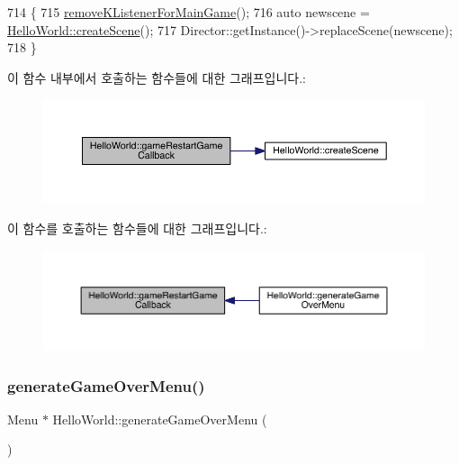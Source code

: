 \begin{DoxyCode}
714                                                     \{
715     \hyperlink{class_hello_world_aa4aaf4a6d2ae2e0cb07273d0ee004861}{removeKListenerForMainGame}();
716     \textcolor{keyword}{auto} newscene =  \hyperlink{class_hello_world_a1b700f5f9de04271533d3fa099d7b014}{HelloWorld::createScene}();
717     Director::getInstance()->replaceScene(newscene);
718 \}
\end{DoxyCode}
이 함수 내부에서 호출하는 함수들에 대한 그래프입니다.\+:
\nopagebreak
\begin{figure}[H]
\begin{center}
\leavevmode
\includegraphics[width=350pt]{d9/d98/class_hello_world_a73ad0d041144a1e610534fe5df41d556_cgraph}
\end{center}
\end{figure}
이 함수를 호출하는 함수들에 대한 그래프입니다.\+:
\nopagebreak
\begin{figure}[H]
\begin{center}
\leavevmode
\includegraphics[width=350pt]{d9/d98/class_hello_world_a73ad0d041144a1e610534fe5df41d556_icgraph}
\end{center}
\end{figure}
\mbox{\label{class_hello_world_a7b22f04ccc721e47e59c4f5470768790}} 
\subsubsection{\texorpdfstring{generate\+Game\+Over\+Menu()}{generateGameOverMenu()}}
{\footnotesize\ttfamily Menu $\ast$ Hello\+World\+::generate\+Game\+Over\+Menu (\begin{DoxyParamCaption}{ }\end{DoxyParamCaption})\hspace{0.3cm}{\ttfamily [protected]}}

